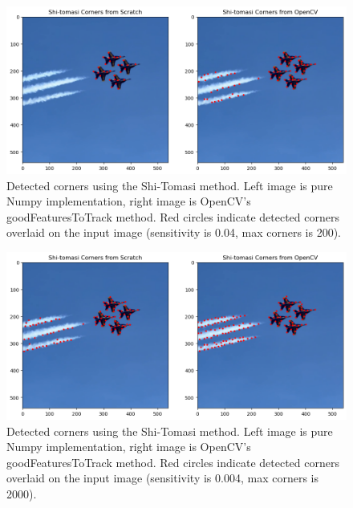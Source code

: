 \documentclass[11pt, conference, letterpaper]{IEEEtran}
\begin{document}
\begin{figure}[h]
    \centering
    \includegraphics[width=0.95\linewidth]{images/shi_tomasi_corners.png}
    \caption{Detected corners using the Shi-Tomasi method. Left image is pure Numpy implementation, right image is OpenCV's goodFeaturesToTrack method. Red circles indicate detected corners overlaid on the input image (sensitivity is 0.04, max corners is 200).}
    \label{fig:shi_tomasi_results}
\end{figure}

\begin{figure}[h]
    \centering
    \includegraphics[width=0.95\linewidth]{images/shi_tomasi_corners_2.png}
    \caption{Detected corners using the Shi-Tomasi method. Left image is pure Numpy implementation, right image is OpenCV's goodFeaturesToTrack method. Red circles indicate detected corners overlaid on the input image (sensitivity is 0.004, max corners is 2000).}
    \label{fig:shi_tomasi_results2}
\end{figure}
\twocolumn
\end{document}
